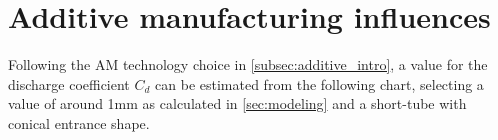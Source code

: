 \section{Additive manufacturing influences}
\label{sec:additive}


Following the AM technology choice in \autoref{subsec:additive_intro}, a value for the discharge coefficient $C_d$ can be estimated from the following chart, selecting a value of around 1mm as calculated in \autoref{sec:modeling} and a short-tube with conical entrance shape. 






